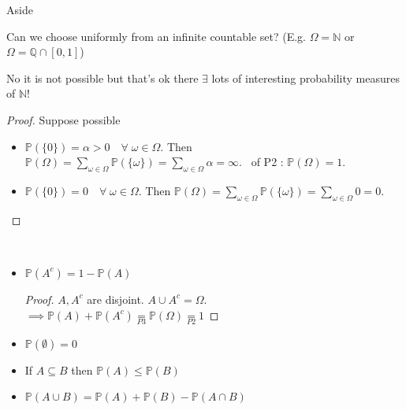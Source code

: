 \begin{aside}{Aside}
    \begin{question}
        Can we choose uniformly from an infinite countable set? (E.g. $\Omega = \mathbb{N}$ or $\Omega = \mathbb{Q} \cap [0, 1]$)
    \end{question} 

    \begin{answer}
        No it is not possible but that's ok there $\exists$ lots of interesting probability measures of $\mathbb{N}$!
    \end{answer} 
    \begin{proof}
        Suppose possible
        \begin{itemize}
            \item $\mathbb{P}(\{0\}) = \alpha > 0 \quad \forall \; \omega \in \Omega$.
            Then $\mathbb{P}(\Omega) = \sum_{\omega \in \Omega} \mathbb{P}(\{ \omega \}) = \sum_{\omega \in \Omega} \alpha = \infty.$ \Lightning \ of P2 : $\mathbb{P}(\Omega) = 1$.
            \item $\mathbb{P}(\{0\}) = 0 \quad \forall \; \omega \in \Omega$.
            Then $\mathbb{P}(\Omega) = \sum_{\omega \in \Omega} \mathbb{P}(\{ \omega \}) = \sum_{\omega \in \Omega} 0 = 0.$
        \end{itemize} 
    \end{proof} 
\end{aside} 

\begin{proposition} ~\vspace*{-1.5\baselineskip}
    \begin{itemize}
        \item $\mathbb{P}(A^c) = 1 - \mathbb{P}(A)$
        \begin{proof}
            $A, A^c$ are disjoint. $A \cup A^c = \Omega$.\\
            $\implies \mathbb{P}(A) + \mathbb{P}(A^c) \underset{P3}{=} \mathbb{P}(\Omega) \underset{P2}{=} 1$
        \end{proof} 
        \item $\mathbb{P}(\emptyset) = 0$
        \item If $A \subseteq B$ then $\mathbb{P}(A) \leq \mathbb{P}(B)$
        \item $\mathbb{P}(A \cup B) = \mathbb{P}(A) + \mathbb{P}(B) - \mathbb{P}(A \cap B)$
    \end{itemize}
\end{proposition}  

